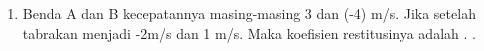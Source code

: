 \documentclass[10pt,a4paper]{extarticle}
\begin{document}
\begin{multicols*}{2}
\begin{enumerate}
\vspace{2cm}

\item Benda A dan B kecepatannya masing-masing 3 dan (-4) m/s. Jika setelah tabrakan menjadi -2m/s dan 1 m/s. Maka koefisien restitusinya adalah . . 
\vspace{2cm}

\end{enumerate}
\end{multicols*}
\end{document}
